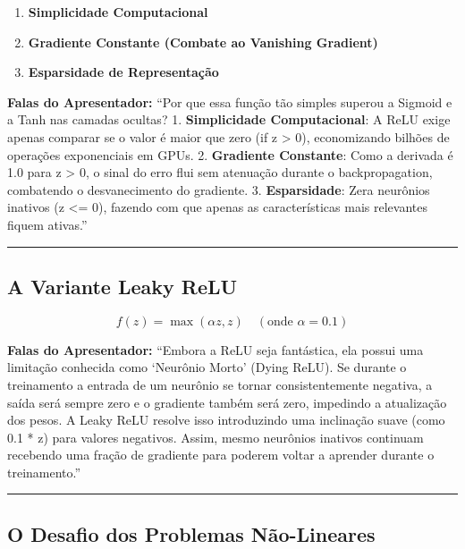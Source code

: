 \documentclass[
  letterpaper,
  DIV=11,
  numbers=noendperiod]{scrartcl}
\providecommand{\tightlist}{%
  \setlength{\itemsep}{0pt}\setlength{\parskip}{0pt}}
\begin{document}
\begin{enumerate}
\def\labelenumi{\arabic{enumi}.}
\tightlist
\item
  \textbf{Simplicidade Computacional}
\item
  \textbf{Gradiente Constante (Combate ao Vanishing Gradient)}
\item
  \textbf{Esparsidade de Representação}
\end{enumerate}

\textbf{Falas do Apresentador:} ``Por que essa função tão simples
superou a Sigmoid e a Tanh nas camadas ocultas? 1. \textbf{Simplicidade
Computacional}: A ReLU exige apenas comparar se o valor é maior que zero
(if z \textgreater{} 0), economizando bilhões de operações exponenciais
em GPUs. 2. \textbf{Gradiente Constante}: Como a derivada é 1.0 para z
\textgreater{} 0, o sinal do erro flui sem atenuação durante o
backpropagation, combatendo o desvanecimento do gradiente. 3.
\textbf{Esparsidade}: Zera neurônios inativos (z \textless= 0), fazendo
com que apenas as características mais relevantes fiquem ativas.''

\begin{center}\rule{0.5\linewidth}{0.5pt}\end{center}

\subsection{A Variante Leaky ReLU}\label{a-variante-leaky-relu}

\[f(z) = \max(\alpha z, z) \quad (\text{onde } \alpha = 0.1)\]

\textbf{Falas do Apresentador:} ``Embora a ReLU seja fantástica, ela
possui uma limitação conhecida como `Neurônio Morto' (Dying ReLU). Se
durante o treinamento a entrada de um neurônio se tornar
consistentemente negativa, a saída será sempre zero e o gradiente também
será zero, impedindo a atualização dos pesos. A Leaky ReLU resolve isso
introduzindo uma inclinação suave (como 0.1 * z) para valores negativos.
Assim, mesmo neurônios inativos continuam recebendo uma fração de
gradiente para poderem voltar a aprender durante o treinamento.''

\begin{center}\rule{0.5\linewidth}{0.5pt}\end{center}

\subsection{O Desafio dos Problemas
Não-Lineares}\label{o-desafio-dos-problemas-nuxe3o-lineares}
\end{document}
